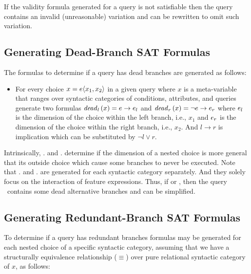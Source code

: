 \documentclass[12pt]{article}
\begin{document}
If the validity formula generated for a query is not satisfiable then the query contains an invalid (unreasonable) variation and can be rewritten to omit such variation.

\subsection{Generating Dead-Branch SAT Formulas}
\label{sec:dead}
The formulas to determine if a query has dead branches  are generated as follows:

\begin{itemize}
\item For every choice $x = \chc {x_1, x_2}$ in a given query 
where $x$ is a meta-variable that
ranges over syntactic categories of conditions, attributes, and queries
generate two formulas $\deadl x = \dimMeta \to \dimMeta_l$ and 
$\deadr x = \neg \dimMeta \to \dimMeta_r$ where $\dimMeta_l$
is the dimension of the choice within the left branch, i.e., $x_1$ and 
$\dimMeta_r$ is the dimension of the choice within the right branch, i.e., $x_2$.
And $l \to r$ is implication which can be substituted by $\neg l \vee r$.
\end{itemize}

Intrinsically, \deadl . and \deadr . determine if the dimension of a nested choice
is more general that its outside choice which cause some branches to never be executed.
Note that \deadl . and \deadr . are generated for each syntactic category separately.
And they solely focus on the interaction of feature expressions. Thus,
if \sat {\deadl \vQ} or \sat {\deadr \vQ}, then the query \vQ\ contains some dead alternative branches
and can be simplified.

\subsection{Generating Redundant-Branch SAT Formulas}
\label{sec:red}

To determine if a query has redundant branches formulas may be generated
for each nested choice of a specific syntactic category, assuming that we have a structurally equivalence relationship ($\equiv$) over pure relational syntactic 
category of $x$, as follows:
\end{document}

